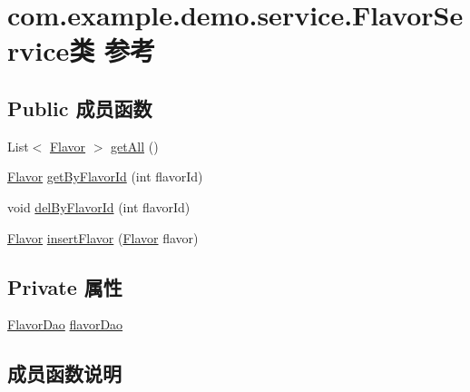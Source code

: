 \hypertarget{classcom_1_1example_1_1demo_1_1service_1_1_flavor_service}{}\section{com.\+example.\+demo.\+service.\+Flavor\+Service类 参考}
\label{classcom_1_1example_1_1demo_1_1service_1_1_flavor_service}
\subsection*{Public 成员函数}
\begin{DoxyCompactItemize}
\item 
List$<$ \mbox{\hyperlink{classcom_1_1example_1_1demo_1_1modular_1_1_flavor}{Flavor}} $>$ \mbox{\hyperlink{classcom_1_1example_1_1demo_1_1service_1_1_flavor_service_a55a48c411e37a62225cb48c3ae9dc3a0}{get\+All}} ()
\item 
\mbox{\hyperlink{classcom_1_1example_1_1demo_1_1modular_1_1_flavor}{Flavor}} \mbox{\hyperlink{classcom_1_1example_1_1demo_1_1service_1_1_flavor_service_a062d0544b1a2885ab9a24f967ba44942}{get\+By\+Flavor\+Id}} (int flavor\+Id)
\item 
void \mbox{\hyperlink{classcom_1_1example_1_1demo_1_1service_1_1_flavor_service_aac24c55c814f1faedd6983150fa0edd5}{del\+By\+Flavor\+Id}} (int flavor\+Id)
\item 
\mbox{\hyperlink{classcom_1_1example_1_1demo_1_1modular_1_1_flavor}{Flavor}} \mbox{\hyperlink{classcom_1_1example_1_1demo_1_1service_1_1_flavor_service_a87c7dd9068f1ac67e2d86e6f1bc286c7}{insert\+Flavor}} (\mbox{\hyperlink{classcom_1_1example_1_1demo_1_1modular_1_1_flavor}{Flavor}} flavor)
\end{DoxyCompactItemize}
\subsection*{Private 属性}
\begin{DoxyCompactItemize}
\item 
\mbox{\hyperlink{interfacecom_1_1example_1_1demo_1_1dao_1_1_flavor_dao}{Flavor\+Dao}} \mbox{\hyperlink{classcom_1_1example_1_1demo_1_1service_1_1_flavor_service_a4f80ead5eda0690021cbf6235b8fd3c0}{flavor\+Dao}}
\end{DoxyCompactItemize}


\subsection{成员函数说明}
\mbox{\label{classcom_1_1example_1_1demo_1_1service_1_1_flavor_service_aac24c55c814f1faedd6983150fa0edd5}} 
